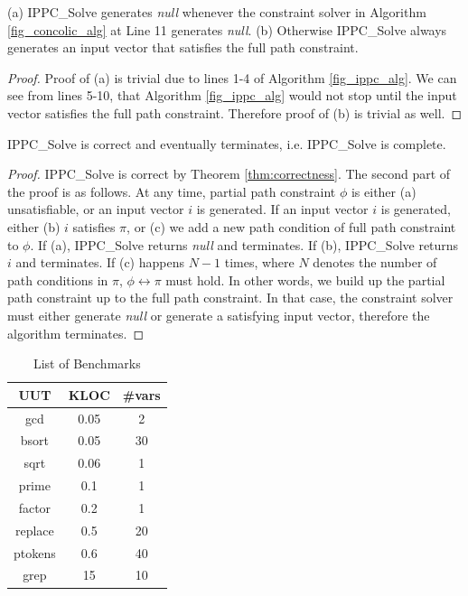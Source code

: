 \documentclass[EPiCempty]{easychair}
\begin{document}
\begin{theorem}
\label{thm:correctness}
(a) IPPC\_Solve generates \emph{null} whenever the constraint solver in Algorithm \ref{fig_concolic_alg} at Line 11 generates \emph{null}. (b) Otherwise IPPC\_Solve always generates an input vector that satisfies the full path constraint.
\end{theorem}

\begin{proof}
Proof of (a) is trivial due to lines 1-4 of Algorithm \ref{fig_ippc_alg}. We can see from lines 5-10, that Algorithm \ref{fig_ippc_alg} would not stop until the input vector satisfies the full path constraint. Therefore proof of (b) is trivial as well.
\end{proof}

\begin{theorem}
\label{thm:completeness}
IPPC\_Solve is correct and eventually terminates, i.e. IPPC\_Solve is complete.
\end{theorem}

\begin{proof}
IPPC\_Solve is correct by Theorem \ref{thm:correctness}. The second part of the proof is as follows. At any time, partial path constraint $\phi$ is either (a) unsatisfiable, or an input vector $i$ is generated. If an input vector $i$ is generated, either (b) $i$ satisfies $\pi$, or (c) we add a new path condition of full path constraint to $\phi$. If (a), IPPC\_Solve returns \emph{null} and terminates. If (b), IPPC\_Solve returns $i$ and terminates. If (c) happens $N-1$ times, where $N$ denotes the number of path conditions in $\pi$, $\phi \leftrightarrow \pi$ must hold. In other words, we build up the partial path constraint up to the full path constraint. In that case, the constraint solver must either generate \emph{null} or generate a satisfying input vector, therefore the algorithm terminates.
\end{proof}

\begin{table}
\centering
\caption{List of Benchmarks}
\vspace*{2pt}
\begin{tabular}{|c|cc|}
\hline
\textbf{UUT} & \textbf{KLOC} & \textbf{{\#}vars} \\
\hline
gcd & 0.05 & 2 \\ 
bsort & 0.05 & 30 \\
sqrt & 0.06 & 1 \\
prime & 0.1 & 1 \\
factor & 0.2 & 1 \\
replace & 0.5 & 20 \\
ptokens & 0.6 & 40 \\
grep & 15 & 10 \\
\hline
\end{tabular}
\label{tbl:benchmarks}
\end{table}
\end{document}
